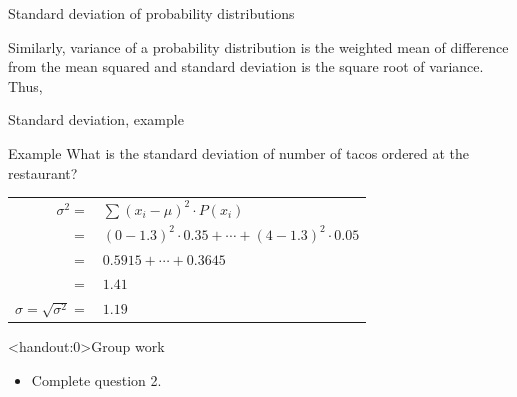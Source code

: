 \documentclass[xcolor=table, aspectratio=169, bigger, handout]{beamer}
\begin{document}
\begin{frame}{Standard deviation of probability distributions}
\begin{block}{}
Similarly, variance of a probability distribution is the weighted mean of difference from the mean squared and standard deviation is the square root of variance.\\
\medskip
Thus, \\ \smallskip
{}
\end{block}
\end{frame}

\begin{frame}{Standard deviation, example}
\begin{exampleblock}{Example}
What is the standard deviation of number of tacos ordered at the restaurant?\\
\medskip
\pause
{\centering
\begin{tabular}{r l}
$\sigma^2 =$ & $\sum (x_i - \mu )^2 \cdot P(x_i)$\\
$=$ & $(0-1.3)^2 \cdot 0.35 + \cdots + (4-1.3)^2 \cdot 0.05$\\
$=$ & $0.5915 + \cdots + 0.3645$\\
$=$ & $1.41$\\
\pause$\sigma = \sqrt{\sigma^2} = $ & $1.19$
\end{tabular}\par
\renewcommand{\arraystretch}{1.5}}
\end{exampleblock}
\end{frame}


\begin{frame}<handout:0>{Group work}
\begin{block}{}
\large
\begin{itemize}
\item Complete question 2.
\end{itemize}
\end{block}
\end{frame}
\end{document}

